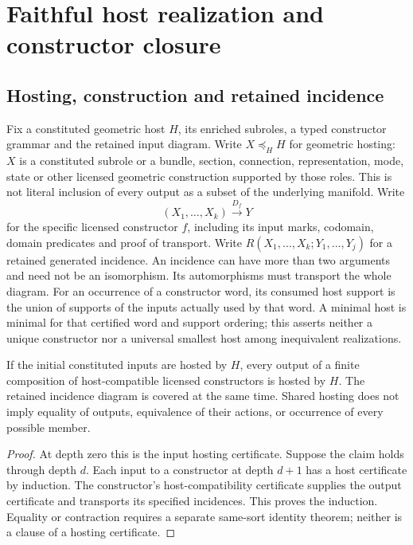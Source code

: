 \documentclass[12pt,a4paper]{article}
\begin{document}
\section{Faithful host realization and constructor closure}
\label{paper2a:sec:organized-hosting}

\subsection{Hosting, construction and retained incidence}

\begin{definition}
\label{p2a:def:host-constructor-incidence-contract}
Fix a constituted geometric host \(H\), its enriched subroles, a typed
constructor grammar and the retained input diagram.  Write
\(X\preceq_H H\) for geometric hosting: \(X\) is a constituted subrole
or a bundle, section, connection, representation, mode, state or other
licensed geometric construction supported by those roles.  This is not
literal inclusion of every output as a subset of the underlying manifold.
Write
\[
 (X_1,\ldots,X_k)\xrightarrow{D_f}Y
\]
for the specific licensed constructor \(f\), including its input marks,
codomain, domain predicates and proof of transport.  Write
\(R(X_1,\ldots,X_k;Y_1,\ldots,Y_j)\) for a retained generated incidence.
An incidence can have more than two arguments and need not be an
isomorphism.  Its automorphisms must transport the whole diagram.
For an occurrence of a constructor word, its consumed host support is
the union of supports of the inputs actually used by that word.
A minimal host is minimal for that certified word and support
ordering; this asserts neither a unique constructor nor a universal
smallest host among inequivalent realizations.
\end{definition}

\begin{corollary}
\label{p2a:cor:recursive-host-coverage}
If the initial constituted inputs are hosted by \(H\), every output
of a finite composition of host-compatible licensed constructors is
hosted by \(H\).  The retained incidence diagram is covered at the
same time.  Shared hosting does not imply equality of outputs,
equivalence of their actions, or occurrence of every possible member.
\end{corollary}
\begin{proof}
At depth zero this is the input hosting certificate.  Suppose the
claim holds through depth \(d\).  Each input to a constructor at depth
\(d+1\) has a host certificate by induction.  The constructor's
host-compatibility certificate supplies the output certificate and
transports its specified incidences.  This proves the induction.
Equality or contraction requires a separate same-sort identity theorem;
neither is a clause of a hosting certificate.
\end{proof}
\end{document}
